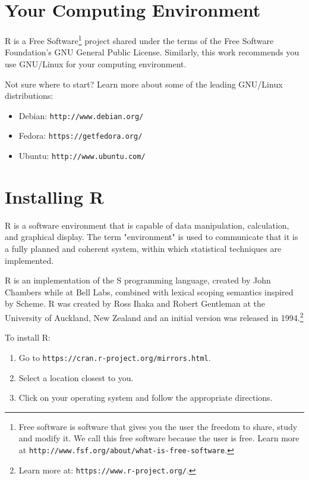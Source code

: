 %
%
%
%
%

\section{Your Computing Environment}
R is a Free Software\footnote{Free software is software that gives you the user the freedom to share, study and modify it. We call this free software because the user is free. Learn more at \texttt{http://www.fsf.org/about/what-is-free-software}.} project shared under the terms of the Free Software Foundation's GNU General Public License. Similarly, this work recommends you use GNU/Linux for your computing environment. 

Not sure where to start? Learn more about some of the leading GNU/Linux distributions:

\begin{itemize}
 \item Debian: \texttt{http://www.debian.org/}
 \item Fedora: \texttt{https://getfedora.org/}
 \item Ubuntu: \texttt{http://www.ubuntu.com/}
\end{itemize}

\section{Installing R}
R is a software environment that is capable of data manipulation, calculation, and graphical display. The term "environment" is used to communicate that it is a fully planned and coherent system, within which statistical techniques are implemented.

R is an implementation of the S programming language, created by John Chambers while at Bell Labs, combined with lexical scoping semantics inspired by Scheme. R was created by Ross Ihaka and Robert Gentleman at the University of Auckland, New Zealand and an initial version was released in 1994.\footnote{Learn more at: \texttt{https://www.r-project.org/}.}

To install R:

\begin{enumerate}
 \item Go to \texttt{https://cran.r-project.org/mirrors.html}.
 \item Select a location closest to you.
 \item Click on your operating system and follow the appropriate directions.
\end{enumerate}

